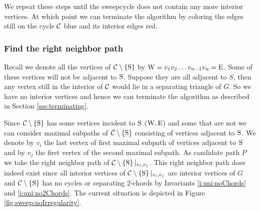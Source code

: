   We repeat these steps until the sweepcycle does not contain any more interior vertices. At which point we can terminate the algorithm by coloring the edges still on the cycle $\mathcal{C}$ blue and its interior edges red.

  \subsubsection{Find the right neighbor path}
    Recall we denote all the vertices of $\mathcal{C} \setminus \left\lbrace {\mathrm{S}} \right\rbrace$ by $\mathrm{W} =  v_1   v_2   \ldots v_{n-1}   v_n = \mathrm{E}$.
    Some of these vertices will not be adjacent to $\mathrm{S}$.
    Suppose they are all adjacent to $S$, then any vertex still in the interior of $\mathcal{C}$ would lie in a separating triangle of $G$. So we have no interior vertices and hence we can terminate the algorithm as described in Section \ref{sss:terminating}.

    Since $\mathcal{C} \setminus \left\lbrace {\mathrm{S}} \right\rbrace$ has some vertices incident to $\mathrm{S}$ ($\mathrm{W} , \mathrm{E}$) and some that are not we can consider maximal subpaths of $\mathcal{C} \setminus \left\lbrace {\mathrm{S}} \right\rbrace$ consisting of vertices adjacent to $\mathrm{S}$.
    We denote by $v_i$ the last vertex of first maximal subpath of vertices adjacent to $\mathrm{S}$ and by $v_j$ the first vertex of the second maximal subpath.
    As candidate path $P$ we take the right neighbor path of $\mathcal{C} \setminus \left\lbrace {\mathrm{S}} \right\rbrace|_{v_i, v_j}$. This right neighbor path does indeed exist since all interior vertices of $\mathcal{C} \setminus \left\lbrace {\mathrm{S}} \right\rbrace|_{v_i, v_j}$ are interior vertices of $G$ and $\mathcal{C} \setminus \left\lbrace {\mathrm{S}} \right\rbrace$ has no cycles or separating 2-chords by Invariants \ref{i:uni:noChords} and \ref{i:uni:no2Chords}.
    The current situation is depicted in Figure \ref{fig:sweep:noIrregularity}.

